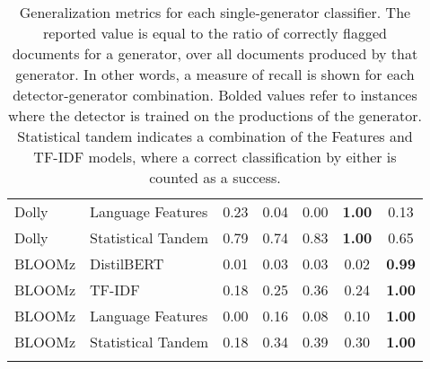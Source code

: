 \begin{table}[ht]
\begin{tabular}{llccccc}
        Dolly   & Language Features  & 0.23          & 0.04          & 0.00          & \textbf{1.00} & 0.13          \\
        Dolly   & Statistical Tandem & 0.79          & 0.74          & 0.83          & \textbf{1.00} & 0.65          \\
        BLOOMz  & DistilBERT         & 0.01          & 0.03          & 0.03          & 0.02          & \textbf{0.99} \\
        BLOOMz  & TF-IDF             & 0.18          & 0.25          & 0.36          & 0.24          & \textbf{1.00} \\
        BLOOMz  & Language Features  & 0.00          & 0.16          & 0.08          & 0.10          & \textbf{1.00} \\
        BLOOMz  & Statistical Tandem & 0.18          & 0.34          & 0.39          & 0.30          & \textbf{1.00} \\
        \bottomrule
        \vspace{0.1cm}
    \end{tabular}
    \caption{
        Generalization metrics for each single-generator classifier.
        The reported value is equal to the ratio of correctly flagged documents for a generator, over all documents produced by that generator.
        In other words, a measure of recall is shown for each detector-generator combination.
        Bolded values refer to instances where the detector is trained on the productions of the generator.
        Statistical tandem indicates a combination of the Features and TF-IDF models, where a correct classification by either is counted as a success.
    }
    \label{tab:generalization}
\end{table}

